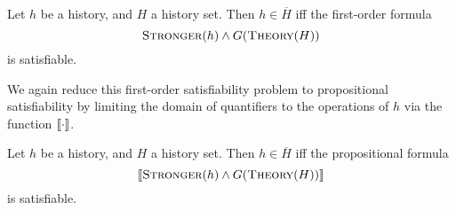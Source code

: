 \begin{theorem}
  \label{th:satisfiability_complete}

  Let $h$ be a history, and $H$ a history set. Then $h \in \overline{H}$ if{f}
  the first-order formula
  $$\textsc{Stronger}(h) \land G(\textsc{Theory}(H))$$
  is satisfiable.

\end{theorem}

We again reduce this first-order satisfiability problem to propositional
satisfiability by limiting the domain of quantifiers to the operations of $h$
via the function $[\![{\cdot}]\!]$.

\begin{corollary}
  \label{cor:satisfiability_pending}

  Let $h$ be a history, and $H$ a history set. Then $h \in \overline{H}$ if{f}
  the propositional formula
  $$[\![{\textsc{Stronger}(h) \land G(\textsc{Theory}(H))}]\!]$$
  is satisfiable.

\end{corollary}
